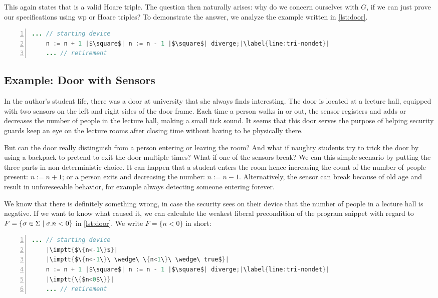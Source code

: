 This again states that  is a valid Hoare triple. 
The question then naturally arises: why do we concern ourselves with $G$, if we can just prove our specifications using wp or Hoare triples? 
To demonstrate the answer, we analyze the example written in \autoref{lst:door}. 

\begin{lstlisting}[caption={Door with Sensors Counting Number of People Present}, label={lst:door}, language=java, numbers=left, stepnumber=1, captionpos=b,escapechar=|,frame=single]
	... // starting device
	n := n + 1 |$\square$| n := n - 1 |$\square$| diverge;|\label{line:tri-nondet}|
	... // retirement  
\end{lstlisting}

\subsection{Example: Door with Sensors}
In the author's student life, there was a door at university that she always finds interesting. 
The door is located at a lecture hall, equipped with two sensors on the left and right sides of the door frame. 
Each time a person walks in or out, the sensor registers and adds or decreases the number of people in the lecture hall, making a small tick sound. 
It seems that this door serves the purpose of helping security guards keep an eye on the lecture rooms after closing time without having to be physically there. 

But can the door really distinguish from a person entering or leaving the room? 
And what if naughty students try to trick the door by using a backpack to pretend to exit the door multiple times? 
What if one of the sensors break? 
We can this simple scenario by putting the three parts in non-deterministic choice. 
It can happen that a student enters the room hence increasing the count of the number of people present: $n:=n+1$; or a person exits and decreasing the number: $n:=n-1$. 
Alternatively, the sensor can break because of old age and result in unforeseeable behavior, for example always detecting someone entering forever. 

We know that there is definitely something wrong, in case the security sees on their device that the number of people in a lecture hall is negative. 
If we want to know what caused it, we can calculate the weakest liberal precondition of the program snippet with regard to $F=\{\sigma\in\S\mid\sigma.n<0\}$ in \autoref{lst:door}. 
We write $F=\{n<0\}$ in short: 
\begin{lstlisting}[caption={Weakest Liberal Precondition w.r.t Postcondition $F=\{\sigma\in\S\mid\sigma.n<0\}$ }, label={lst:neg0}, language=java, numbers=left, stepnumber=1, captionpos=b,escapechar=|,frame=single]
	... // starting device
	|\imptt{$\{n<-1\}$}|
	|\imptt{$\{n<-1\}\ \wedge\ \{n<1\}\ \wedge\ true$}|
	n := n + 1 |$\square$| n := n - 1 |$\square$| diverge;|\label{line:tri-nondet}|
	|\imptt{\{$n<0$\}}|
	... // retirement   
\end{lstlisting}

